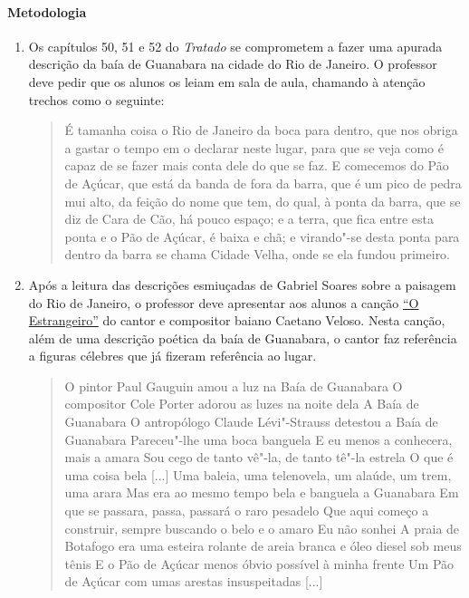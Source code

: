 \documentclass[12pt]{extarticle}
\begin{document}
\paragraph{Metodologia}
\begin{enumerate}

\item Os capítulos 50, 51 e 52 do \textit{Tratado} se comprometem a fazer
uma apurada descrição da baía de Guanabara na cidade do Rio de Janeiro. 
O professor deve pedir que os alunos os leiam em sala de aula, chamando
à atenção trechos como o seguinte:

\begin{quote} É tamanha coisa o Rio de Janeiro da boca para dentro, que 
nos obriga a gastar o tempo em o declarar neste lugar, para que se veja 
como é capaz de se fazer mais conta dele do que se faz. E comecemos do 
Pão de Açúcar, que está da banda de fora da barra, que é um pico de
pedra mui alto, da feição do nome que tem, do qual, à ponta da barra, 
que se diz de Cara de Cão, há pouco espaço; e a terra, que fica entre 
esta ponta e o Pão de Açúcar, é baixa e chã; e virando"-se desta ponta 
para dentro da barra se chama Cidade Velha, onde se ela fundou primeiro.
\end{quote}

\item
Após a leitura das descrições esmiuçadas de Gabriel Soares sobre a 
paisagem do Rio de Janeiro, o professor deve apresentar aos alunos 
a canção \href{https://www.youtube.com/watch?v=uIMZLr7LXVE}{``O Estrangeiro''} do cantor e compositor baiano Caetano Veloso.
Nesta canção, além de uma descrição poética da baía de Guanabara, o 
cantor faz referência a figuras célebres que já fizeram referência ao
lugar. 

\begin{verse}
O pintor Paul Gauguin amou a luz na Baía de Guanabara
O compositor Cole Porter adorou as luzes na noite dela
A Baía de Guanabara
O antropólogo Claude Lévi"-Strauss detestou a Baía de Guanabara
Pareceu"-lhe uma boca banguela
E eu menos a conhecera, mais a amara
Sou cego de tanto vê"-la, de tanto tê"-la estrela
O que é uma coisa bela
[...]
Uma baleia, uma telenovela, um alaúde, um trem, uma arara
Mas era ao mesmo tempo bela e banguela a Guanabara
Em que se passara, passa, passará o raro pesadelo
Que aqui começo a construir, sempre buscando o belo e o amaro
Eu não sonhei
A praia de Botafogo era uma esteira rolante de areia branca e óleo diesel sob meus tênis
E o Pão de Açúcar menos óbvio possível à minha frente
Um Pão de Açúcar com umas arestas insuspeitadas
[...]
\end{verse}


\end{enumerate}
\end{document}

